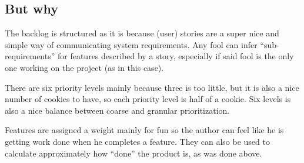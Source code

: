 \subsection*{But why}

The backlog is structured as it is
because (user) stories are a super nice and simple way
of communicating system requirements.
Any fool can infer ``sub-requirements'' for features described by a story,
especially if said fool is the only one working on the project
(as in this case).

There are six priority levels
mainly because three is too little,
but it is also a nice number of cookies to have,
so each priority level is half of a cookie.
Six levels is also a nice balance
between coarse and granular prioritization.

Features are assigned a weight
mainly for fun so the author can feel like he is getting work done
when he completes a feature.
They can also be used to calculate approximately how ``done''
the product is, as was done above.
